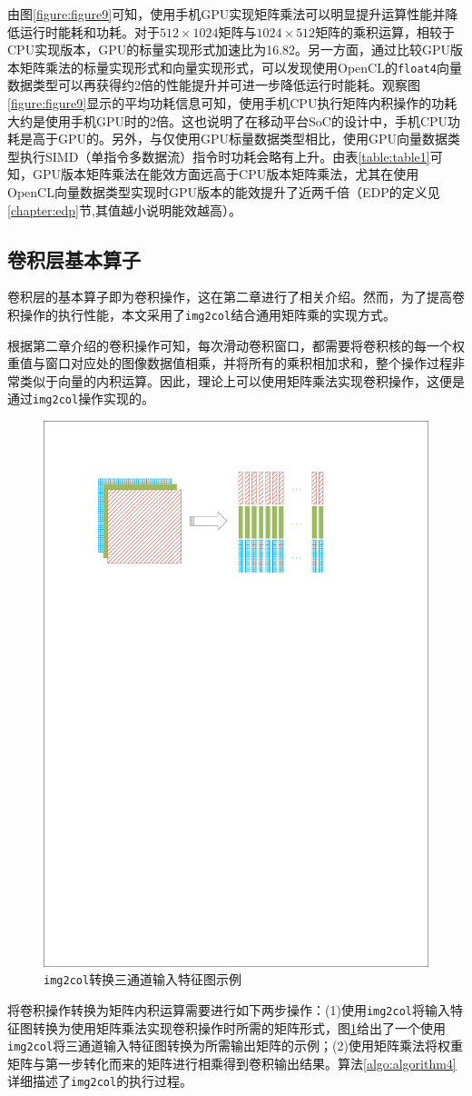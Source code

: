 由图\ref{figure:figure9}可知，使用手机GPU实现矩阵乘法可以明显提升运算性能并降低运行时能耗和功耗。对于$512\times1024$矩阵与$1024\times512$矩阵的乘积运算，相较于CPU实现版本，GPU的标量实现形式加速比为16.82。另一方面，通过比较GPU版本矩阵乘法的标量实现形式和向量实现形式，可以发现使用OpenCL的\texttt{float4}向量数据类型可以再获得约2倍的性能提升并可进一步降低运行时能耗。观察图\ref{figure:figure9}显示的平均功耗信息可知，使用手机CPU执行矩阵内积操作的功耗大约是使用手机GPU时的2倍。这也说明了在移动平台SoC的设计中，手机CPU功耗是高于GPU的。另外，与仅使用GPU标量数据类型相比，使用GPU向量数据类型执行SIMD（单指令多数据流）指令时功耗会略有上升。由表\ref{table:table1}可知，GPU版本矩阵乘法在能效方面远高于CPU版本矩阵乘法，尤其在使用OpenCL向量数据类型实现时GPU版本的能效提升了近两千倍（EDP的定义见\ref{chapter:edp}节,其值越小说明能效越高）。

\subsection{卷积层基本算子}

卷积层的基本算子即为卷积操作，这在第二章进行了相关介绍。然而，为了提高卷积操作的执行性能，本文采用了\texttt{img2col}结合通用矩阵乘的实现方式。

根据第二章介绍的卷积操作可知，每次滑动卷积窗口，都需要将卷积核的每一个权重值与窗口对应处的图像数据值相乘，并将所有的乘积相加求和，整个操作过程非常类似于向量的内积运算。因此，理论上可以使用矩阵乘法实现卷积操作，这便是通过\texttt{img2col}操作实现的。

\begin{figure}[htb]
    \begin{center}
    \includegraphics[height=0.3\textwidth]{figures/im2col.pdf}
    \end{center}
    \caption{\texttt{img2col}转换三通道输入特征图示例}\label{figure:figure10}
\end{figure}

将卷积操作转换为矩阵内积运算需要进行如下两步操作：(1)使用\texttt{img2col}将输入特征图转换为使用矩阵乘法实现卷积操作时所需的矩阵形式，图\ref{figure:figure10}给出了一个使用\texttt{img2col}将三通道输入特征图转换为所需输出矩阵的示例；(2)使用矩阵乘法将权重矩阵与第一步转化而来的矩阵进行相乘得到卷积输出结果。算法\ref{algo:algorithm4}详细描述了\texttt{img2col}的执行过程。

